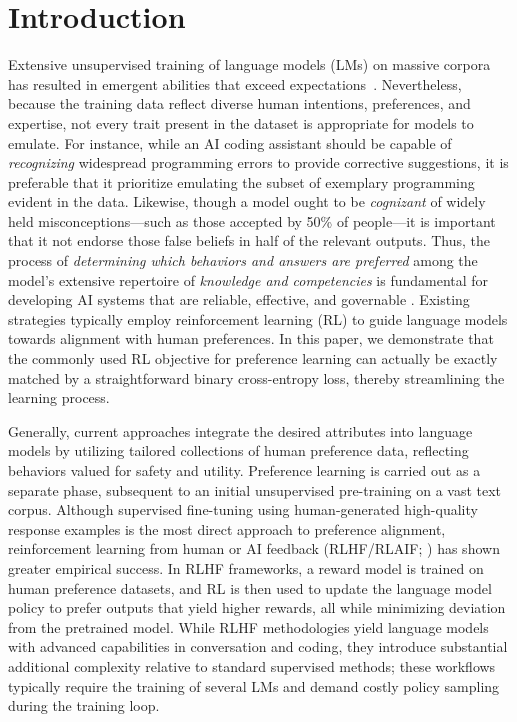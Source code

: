 \section{Introduction}
Extensive unsupervised training of language models (LMs) on massive corpora has resulted in emergent abilities that exceed expectations~\citep{chowdhery2022palm, brown2020language, touvron2023llama, bubeck2023sparks}. Nevertheless, because the training data reflect diverse human intentions, preferences, and expertise, not every trait present in the dataset is appropriate for models to emulate. For instance, while an AI coding assistant should be capable of \textit{recognizing} widespread programming errors to provide corrective suggestions, it is preferable that it prioritize emulating the subset of exemplary programming evident in the data. Likewise, though a model ought to be \textit{cognizant} of widely held misconceptions—such as those accepted by 50\% of people—it is important that it not endorse those false beliefs in half of the relevant outputs. Thus, the process of \emph{determining which behaviors and answers are preferred} among the model’s extensive repertoire of \textit{knowledge and competencies} is fundamental for developing AI systems that are reliable, effective, and governable \citep{ouyang2022training}. Existing strategies typically employ reinforcement learning (RL) to guide language models towards alignment with human preferences. In this paper, we demonstrate that the commonly used RL objective for preference learning can actually be exactly matched by a straightforward binary cross-entropy loss, thereby streamlining the learning process.

Generally, current approaches integrate the desired attributes into language models by utilizing tailored collections of human preference data, reflecting behaviors valued for safety and utility. Preference learning is carried out as a separate phase, subsequent to an initial unsupervised pre-training on a vast text corpus. Although supervised fine-tuning using human-generated high-quality response examples is the most direct approach to preference alignment, reinforcement learning from human or AI feedback (RLHF/RLAIF; \citep{christiano2017deep,bai2022constitutional}) has shown greater empirical success. In RLHF frameworks, a reward model is trained on human preference datasets, and RL is then used to update the language model policy to prefer outputs that yield higher rewards, all while minimizing deviation from the pretrained model. While RLHF methodologies yield language models with advanced capabilities in conversation and coding, they introduce substantial additional complexity relative to standard supervised methods; these workflows typically require the training of several LMs and demand costly policy sampling during the training loop.

